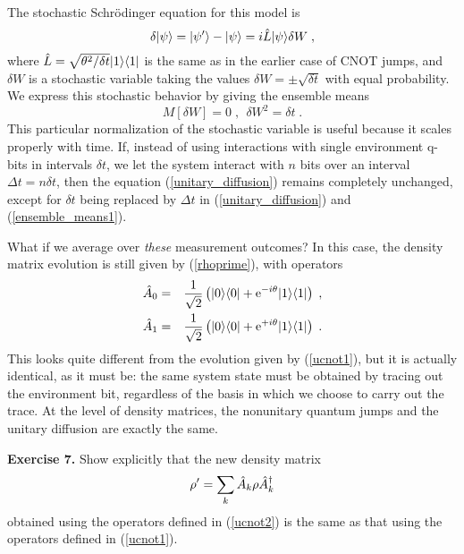 The stochastic Schr\"odinger equation for this model is
\begin{equation}
\delta{| \psi \rangle} = {| \psi' \rangle} - {| \psi \rangle} = i {\hat L} {| \psi \rangle} \delta W \;,
\label{unitary_diffusion}
\end{equation}
where ${\hat L}=\sqrt{\theta^2/\delta t}{| 1 \rangle}{\langle 1 |}$ is the same as in the
earlier case of CNOT jumps, and $\delta W$ is a stochastic variable taking
the values $\delta W = \pm \sqrt{\delta t}$ with equal probability.
We express this stochastic behavior by giving the ensemble means
\begin{equation}
M[\delta W] = 0 \;, \ \ \delta W^2 = \delta t \;.
\label{ensemble_means1}
\end{equation}
This particular normalization of the stochastic variable is useful
because it scales properly with time.  If, instead of using interactions
with single environment q-bits in intervals $\delta t$, we let
the system interact with $n$ bits over an interval $\Delta t = n\delta t$,
then the equation (\ref{unitary_diffusion}) remains completely
unchanged, except for $\delta t$ being replaced by $\Delta t$ in
(\ref{unitary_diffusion}) and (\ref{ensemble_means1}).

What if we average over {\it these} measurement outcomes?  In this case,
the density matrix evolution is still given by (\ref{rhoprime}),
with operators
\begin{eqnarray}
{\hat A}_0 &=& {1\over\sqrt2}\left({| 0 \rangle}{\langle 0 |}
  + {\rm e}^{-i\theta}{| 1 \rangle}{\langle 1 |} \right) \;, \nonumber\\
{\hat A}_1 &=& {1\over\sqrt2}\left({| 0 \rangle}{\langle 0 |}
  + {\rm e}^{+i\theta}{| 1 \rangle}{\langle 1 |} \right) \;.
\label{ucnot2}
\end{eqnarray}
This looks quite different from the evolution given by (\ref{ucnot1}),
but it is actually identical, as it must be:  the same system state must
be obtained by tracing out the environment bit, regardless of the basis
in which we choose to carry out the trace.
At the level of density matrices, the nonunitary quantum jumps and the
unitary diffusion are exactly the same.

\medskip\noindent
{\bf Exercise 7.}  Show explicitly that the new density matrix
\begin{equation}
\rho' = \sum_k {\hat A}_k \rho {\hat A^\dagger}_k
\end{equation}
obtained using the operators defined in (\ref{ucnot2}) is the same as
that using the operators defined in (\ref{ucnot1}).
\medskip

